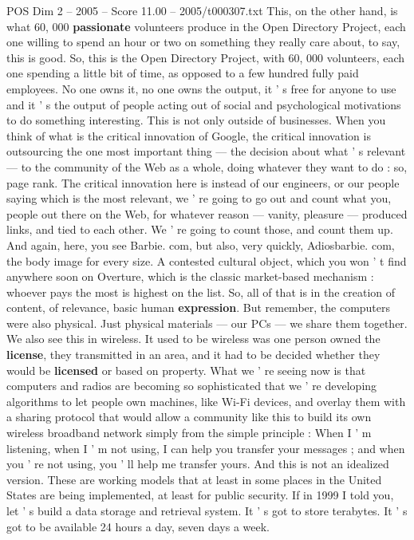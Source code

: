 \begin{textsample}{POS Dim 2 – 2005 – Score 11.00 – 2005/t000307.txt}
This, on the other hand, is what 60, 000 \textbf{passionate} volunteers produce in the Open Directory Project, each one willing to spend an hour or two on something they really care about, to say, this is good.
So, this is the Open Directory Project, with 60, 000 volunteers, each one spending a little bit of time, as opposed to a few hundred fully paid employees.
No one owns it, no one owns the output, it ' s free for anyone to use and it ' s the output of people acting out of social and psychological motivations to do something interesting.
This is not only outside of businesses.
When you think of what is the critical innovation of Google, the critical innovation is outsourcing the one most important thing — the decision about what ' s relevant — to the community of the Web as a whole, doing whatever they want to do : so, page rank.
The critical innovation here is instead of our engineers, or our people saying which is the most relevant, we ' re going to go out and count what you, people out there on the Web, for whatever reason — vanity, pleasure — produced links, and tied to each other.
We ' re going to count those, and count them up.
And again, here, you see Barbie. com, but also, very quickly, Adiosbarbie. com, the body image for every size.
A contested cultural object, which you won ' t find anywhere soon on Overture, which is the classic market-based mechanism : whoever pays the most is highest on the list.
So, all of that is in the creation of content, of relevance, basic human \textbf{expression}.
But remember, the computers were also physical.
Just physical materials — our PCs — we share them together.
We also see this in wireless.
It used to be wireless was one person owned the \textbf{license}, they transmitted in an area, and it had to be decided whether they would be \textbf{licensed} or based on property.
What we ' re seeing now is that computers and radios are becoming so sophisticated that we ' re developing algorithms to let people own machines, like Wi-Fi devices, and overlay them with a sharing protocol that would allow a community like this to build its own wireless broadband network simply from the simple principle : When I ' m listening, when I ' m not using, I can help you transfer your messages ; and when you ' re not using, you ' ll help me transfer yours.
And this is not an idealized version.
These are working models that at least in some places in the United States are being implemented, at least for public security.
If in 1999 I told you, let ' s build a data storage and retrieval system.
It ' s got to store terabytes.
It ' s got to be available 24 hours a day, seven days a week.

\end{textsample}
